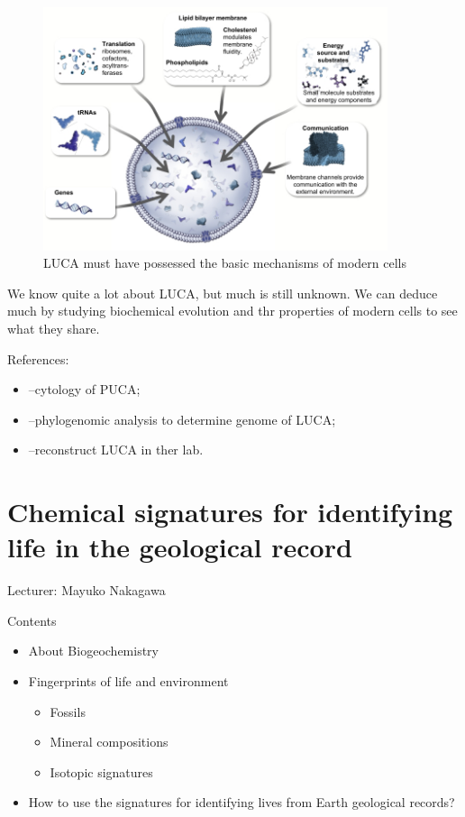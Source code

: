 \documentclass[]{article}
\begin{document}
\begin{figure}[H]
	\caption{LUCA must have possessed the basic mechanisms of  modern cells}\label{fig:LUCA_Attributes}
	\includegraphics[width=0.9\textwidth]{LUCA_Attributes}
\end{figure}

We know quite a lot about LUCA, but much is still unknown. We can deduce much by studying biochemical evolution and thr properties of modern cells to see what they share.

References:
\begin{itemize}
	\item \cite{penny1999nature}--cytology of PUCA;
	\item \cite{weiss2016physiology}--phylogenomic analysis to determine genome of LUCA;
	\item \cite{torino2013piecing}--reconstruct LUCA in ther lab.
\end{itemize}

\section{Chemical signatures for identifying life in the geological record}

Lecturer: Mayuko Nakagawa

Contents
\begin{itemize}
	\item About Biogeochemistry
	\item Fingerprints of life and environment
	\begin{itemize}
		\item Fossils
		\item Mineral compositions
		\item Isotopic signatures
	\end{itemize}
	\item How to use the signatures for identifying lives from 	Earth geological records?
\end{itemize}
\end{document}
